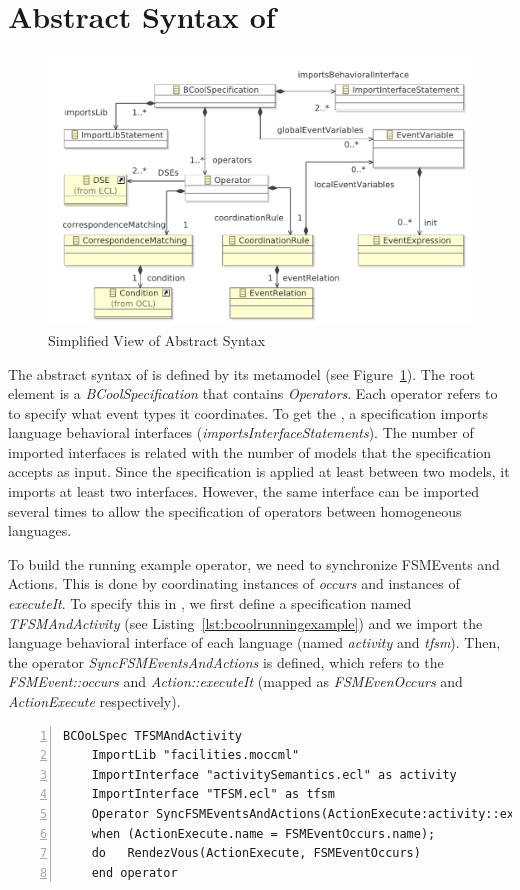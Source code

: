\section{Abstract Syntax of \bcool}
\begin{figure}
	\center
	\includegraphics[width=.8\textwidth]{bcool/figs/BcoolMM}
	\caption{Simplified View of \bcool Abstract Syntax}
	\label{fig:bcool}
\end{figure}

The abstract syntax of \bcool is defined by its metamodel (see Figure~\ref{fig:bcool}). The root element is a \emph{BCoolSpecification} that contains \emph{Operators}. Each operator refers to \dse to specify what event types it coordinates. To get the \dse, a \bcool specification imports language behavioral interfaces (\emph{importsInterfaceStatements}). The number of imported interfaces is related with the number of models that the specification accepts as input. Since the \bcool specification is applied at least between two models, it imports at least two interfaces. However, the same interface can be imported several times to allow the specification of operators between homogeneous languages.   

To build the running example operator, we need to synchronize FSMEvents and Actions. This is done by coordinating instances of \dse \emph{occurs} and instances of \dse \emph{executeIt}. To specify this in \bcool, we first define a specification named \emph{TFSMAndActivity} (see Listing~\ref{lst:bcoolrunningexample}) and we import the language behavioral interface of each language (named \emph{activity} and \emph{tfsm}). Then, the operator \emph{SyncFSMEventsAndActions} is defined, which refers to the \dse \emph{FSMEvent::occurs} and \emph{Action::executeIt} (mapped as \emph{FSMEvenOccurs} and \emph{ActionExecute} respectively). 
	
	 
	\begin{lstlisting}[language=bcool,
	caption={\bcool specification of the running example operator between the TFSM and Activity languages},
	label={lst:bcoolrunningexample}, 
	basicstyle=\scriptsize\ttfamily, backgroundcolor=\color{LGrey}, numbers=left, xleftmargin=2pt]
	BCOoLSpec TFSMAndActivity
	ImportLib "facilities.moccml"
	ImportInterface "activitySemantics.ecl" as activity
	ImportInterface "TFSM.ecl" as tfsm
	Operator SyncFSMEventsAndActions(ActionExecute:activity::executeIt, FSMEventOccurs:tfsm::occurs)
	when (ActionExecute.name = FSMEventOccurs.name);
	do   RendezVous(ActionExecute, FSMEventOccurs)
	end operator
	\end{lstlisting}
	
